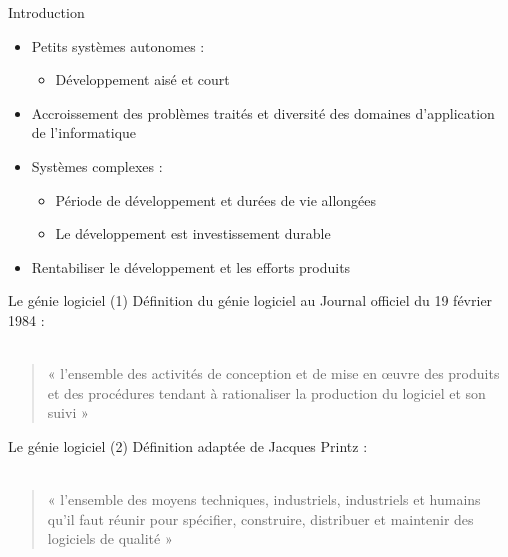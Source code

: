 \documentclass[14pt]{beamer}
\begin{document}
\begin{framentitle}{Introduction}
    \begin{itemize}
        \item Petits systèmes autonomes :
            \begin{itemize}
                \item Développement aisé et court
            \end{itemize}
        \item Accroissement des problèmes traités et diversité des domaines
            d'application de l'informatique
        \item[\ra] Systèmes complexes :
            \begin{itemize}
                \item Période de développement et durées de vie allongées
                \item Le développement est investissement durable
            \end{itemize}
        \item[\ra] Rentabiliser le développement et les efforts produits
    \end{itemize}
\end{framentitle}

\begin{framentitle}{Le génie logiciel (1)}
    Définition du génie logiciel au Journal officiel du 19 février 1984 :\\~
    \begin{quote}
        « l'ensemble des activités de conception et de mise en œuvre des
        produits et des procédures tendant à rationaliser la production du
        logiciel et son suivi »
    \end{quote}
\end{framentitle}

\begin{framentitle}{Le génie logiciel (2)}
    Définition adaptée de Jacques Printz :\\~
    \begin{quote}
        « l'ensemble des moyens techniques, industriels, industriels et humains
        qu'il faut réunir pour spécifier, construire, distribuer et maintenir
        des logiciels de qualité »
    \end{quote}
\end{framentitle}
\end{document}
